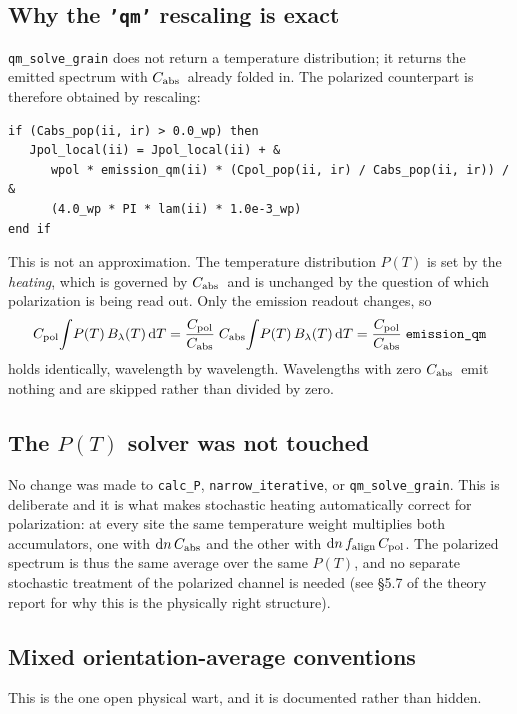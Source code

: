 \documentclass{my_memo}
\newcommand{\code}[1]{\texttt{#1}}
\newcommand{\Cabs}{\ensuremath{C_{\rm abs}}}
\newcommand{\Cpol}{\ensuremath{C_{\rm pol}}}
\newcommand{\falign}{\ensuremath{f_{\rm align}}}
\begin{document}
\subsection{Why the \code{'qm'} rescaling is exact}

\code{qm\_solve\_grain} does not return a temperature distribution; it returns
the emitted spectrum with \Cabs\ already folded in. The polarized counterpart
is therefore obtained by rescaling:
\begin{lstlisting}
if (Cabs_pop(ii, ir) > 0.0_wp) then
   Jpol_local(ii) = Jpol_local(ii) + &
      wpol * emission_qm(ii) * (Cpol_pop(ii, ir) / Cabs_pop(ii, ir)) / &
      (4.0_wp * PI * lam(ii) * 1.0e-3_wp)
end if
\end{lstlisting}
This is not an approximation. The temperature distribution $P(T)$ is set by the
\emph{heating}, which is governed by \Cabs\ and is unchanged by the question of
which polarization is being read out. Only the emission readout changes, so
\begin{equation}
C_{\rm pol}\!\int\! P(T)\,B_\lambda(T)\,{\rm d}T
=\frac{C_{\rm pol}}{C_{\rm abs}}\;
 C_{\rm abs}\!\int\! P(T)\,B_\lambda(T)\,{\rm d}T
=\frac{C_{\rm pol}}{C_{\rm abs}}\;\code{emission\_qm}
\end{equation}
holds identically, wavelength by wavelength. Wavelengths with zero \Cabs\ emit
nothing and are skipped rather than divided by zero.

\subsection{The $P(T)$ solver was not touched}

No change was made to \code{calc\_P}, \code{narrow\_iterative}, or
\code{qm\_solve\_grain}. This is deliberate and it is what makes stochastic
heating automatically correct for polarization: at every site the same
temperature weight multiplies both accumulators, one with
${\rm d}n\,\Cabs$ and the other with ${\rm d}n\,\falign\,\Cpol$. The polarized
spectrum is thus the same average over the same $P(T)$, and no separate
stochastic treatment of the polarized channel is needed (see \S5.7 of the
theory report for why this is the physically right structure).

\subsection{Mixed orientation-average conventions}\label{sec:mixed}

This is the one open physical wart, and it is documented rather than hidden.
\end{document}
